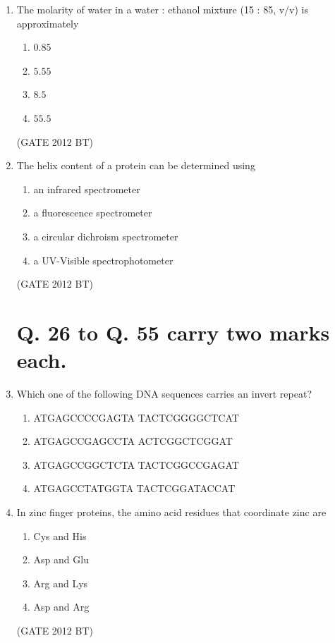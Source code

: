 \documentclass[journal,12pt,onecolumn]{IEEEtran}
\theoremstyle{remark}
\begin{document}
\begin{enumerate}
\item The molarity of water in a water : ethanol mixture (15 : 85, v/v) is approximately
\begin{multicols}{4}
\begin{enumerate}
\item $0.85$	
\item  $5.55$
\item  $8.5$
\item  $55.5$
\end{enumerate}
\end{multicols} \hfill(GATE 2012 BT)

\item The helix content of a protein can be determined using
\begin{multicols}{2}
\begin{enumerate}
\item	an infrared spectrometer	
\item a fluorescence spectrometer
\item a circular dichroism spectrometer	
\item a UV-Visible spectrophotometer
\end{enumerate}
\end{multicols} \hfill(GATE 2012 BT)

\section{Q. 26 to Q. 55 carry two marks each.}
\item Which one of the following DNA sequences carries an invert repeat?
\begin{enumerate}
\item	ATGAGCCCCGAGTA TACTCGGGGCTCAT
\item  ATGAGCCGAGCCTA ACTCGGCTCGGAT
\item ATGAGCCGGCTCTA TACTCGGCCGAGAT
\item  ATGAGCCTATGGTA TACTCGGATACCAT
\end{enumerate}
 
\item 	In zinc finger proteins, the amino acid residues that coordinate zinc are
\begin{multicols}{4}
\begin{enumerate}
\item	Cys and His	
\item  Asp and Glu
\item  Arg and Lys	
\item  Asp and Arg
\end{enumerate}
\end{multicols} \hfill(GATE 2012 BT)


\end{enumerate}
\end{document}

